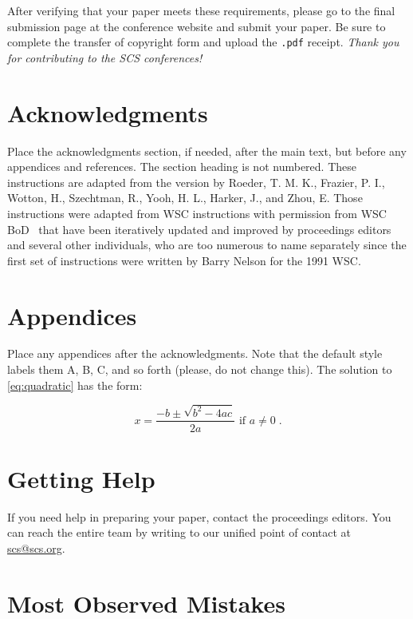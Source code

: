 \documentclass{article}
\begin{document}
After verifying that your paper meets these requirements, please go to the final submission page at the conference website and submit your paper. Be sure to complete the transfer of copyright form and upload the \texttt{.pdf} receipt. \textit{Thank you for contributing to the SCS conferences!}


\section*{Acknowledgments}

Place the acknowledgments section, if needed, after the main text, but before any appendices and references. The section heading is not numbered. These instructions are adapted from the version by Roeder, T. M. K., Frazier, P. I., Wotton, H., Szechtman, R., Yooh, H. L., Harker, J., and Zhou, E. Those instructions were adapted from WSC instructions with permission from WSC BoD~\cite{WSC} that have been iteratively updated and improved by proceedings editors and several other individuals, who are too numerous to name separately since the first set of instructions were written by Barry Nelson for the 1991 WSC.



\section{Appendices} \label{app:quadratic}
Place any appendices after the acknowledgments. Note that the default style labels them A, B, C, and so forth (please, do not change this). 
The solution to \eqref{eq:quadratic} has the form:

\begin{equation} \label{eq:quadratic sol}
x = \frac{-b \pm \sqrt{b^2-4ac}}{2a} \mbox{ if } a \ne 0\;.
\end{equation}


\section{Getting Help}
If you need help in preparing your paper, contact the proceedings editors. You can reach the entire team by writing to our unified point of contact at \href{mailto://scs@scs.org}{scs@scs.org}. 


\section{Most Observed Mistakes}
\end{document}
